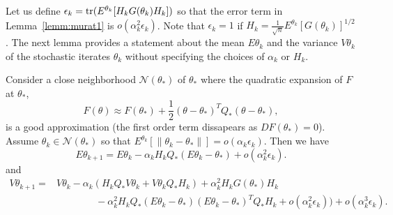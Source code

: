 \documentclass[12pt]{article}
\begin{document}
\noindent
Let us define $\epsilon_k = \mbox{tr}(E^{\theta_k}[H_kG(\theta_k)H_k])$ so that the error term in Lemma~\eqref{lemm:murat1} is $o(\alpha_k^2\epsilon_k)$.  Note that $\epsilon_k=1$ if $H_k=\frac{1}{\sqrt{n}}E^{\theta_k}[G(\theta_k)]^{1/2}$.  The next lemma provides a statement about the mean $E\theta_k$ and the variance $V\theta_k$ of the stochastic iterates $\theta_k$ without specifying the choices of $\alpha_k$ or $H_k$.
\begin{lemma}
\label{lemm:murat2}
Consider a close neighborhood $\mathcal{N}(\theta_\ast)$ of $\theta_\ast$ where the quadratic expansion of $F$ at $\theta_\ast$,
\[
 F(\theta) \approx F(\theta_\ast) + \frac{1}{2}(\theta-\theta_\ast)^TQ_\ast(\theta-\theta_\ast),%
\]
is a good approximation (the first order term dissapears as $DF(\theta_\ast)=0$).  
Assume $\theta_k\in\mathcal{N}(\theta_\ast)$ so that $E^{\theta_k}[\|\theta_k-\theta_\ast\|]=
o(\alpha_k\epsilon_k)$.  Then we have
\[
 E\theta_{k+1} = E\theta_k - \alpha_k H_k Q_\ast (E\theta_k - \theta_\ast) + o(\alpha_k^2\epsilon_k).
\]
and
\begin{align*}
 V\theta_{k+1} = & V\theta_k - \alpha_k (H_kQ_\ast V\theta_k + V\theta_kQ_\ast H_k) + \alpha_k^2H_kG(\theta_\ast)H_k\\ 
                       & \qquad\qquad -\alpha_k^2H_kQ_\ast(E\theta_k-\theta_\ast)(E\theta_k-\theta_\ast)^TQ_\ast H_k + o(\alpha_k^2\epsilon_k))+ o(\alpha_k^3\epsilon_k).
\end{align*}
\end{lemma}
\footnotesize
\end{document}
